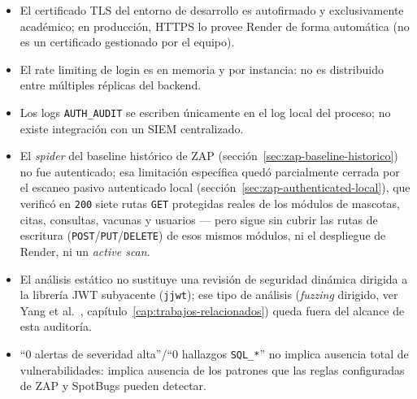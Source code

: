\begin{itemize}[nosep]
  \item El certificado TLS del entorno de desarrollo es autofirmado y
    exclusivamente acad\'emico; en producci\'on, HTTPS lo provee Render de
    forma autom\'atica (no es un certificado gestionado por el equipo).
  \item El rate limiting de login es en memoria y por instancia: no es
    distribuido entre m\'ultiples r\'eplicas del backend.
  \item Los logs \texttt{AUTH\_AUDIT} se escriben \'unicamente en el log
    local del proceso; no existe integraci\'on con un SIEM centralizado.
  \item El \emph{spider} del baseline hist\'orico de ZAP
    (secci\'on~\ref{sec:zap-baseline-historico}) no fue autenticado; esa
    limitaci\'on espec\'ifica qued\'o parcialmente cerrada por el escaneo
    pasivo autenticado local (secci\'on~\ref{sec:zap-authenticated-local}),
    que verific\'o en \texttt{200} siete rutas \texttt{GET} protegidas
    reales de los m\'odulos de mascotas, citas, consultas, vacunas y
    usuarios --- pero sigue sin cubrir las rutas de escritura
    (\texttt{POST}/\texttt{PUT}/\texttt{DELETE}) de esos mismos m\'odulos,
    ni el despliegue de Render, ni un \emph{active scan}.
  \item El an\'alisis est\'atico no sustituye una revisi\'on de seguridad
    din\'amica dirigida a la librer\'ia JWT subyacente (\texttt{jjwt}); ese
    tipo de an\'alisis (\emph{fuzzing} dirigido, ver
    Yang et al.~\cite{yang2026tokentimebomb}, cap\'itulo~\ref{cap:trabajos-relacionados})
    queda fuera del alcance de esta auditor\'ia.
  \item ``0 alertas de severidad alta''/``0 hallazgos \texttt{SQL\_*}'' no
    implica ausencia total de vulnerabilidades: implica ausencia de los
    patrones que las reglas configuradas de ZAP y SpotBugs pueden detectar.
\end{itemize}
